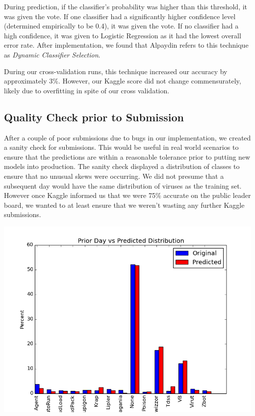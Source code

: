 \documentclass[11pt, oneside]{article}   	%
\begin{document}
During prediction, if the classifier's probability was higher than this threshold, it was given the vote. If one classifier had a significantly higher confidence level (determined empirically to be 0.4), it was given the vote. If no classifier had a high confidence, it was given to Logistic Regression as it had the lowest overall error rate. After implementation, we found that Alpaydin refers to this technique as \emph{Dynamic Classifier Selection}.\cite{alpaydin}



During our cross-validation runs, this technique increased our accuracy by approximately 3\%. However, our Kaggle score did not change commensurately, likely due to overfitting in spite of our cross validation. 


\subsection*{Quality Check prior to Submission}

After a couple of poor submissions due to bugs in our implementation, we created a sanity check for submissions. This would be useful in real world scenarios to ensure that the predictions are within a reasonable tolerance prior to putting new models into production. The sanity check displayed a distribution of classes to ensure that no unusual skews were occurring. We did not presume that a subsequent day would have the same distribution of viruses as the training set. However once Kaggle informed us that we were 75\% accurate on the public leader board, we wanted to at least ensure that we weren't wasting any further Kaggle submissions. 
\begin{center}
\includegraphics[scale=.65]{predictVactual}
\end{center}
\end{document}
